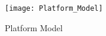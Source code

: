 \begin{figure}[h]
    \centering
    \texttt{[image: Platform\_Model]}
    \caption{Platform Model}
    \label{fig:2}
\end{figure}
